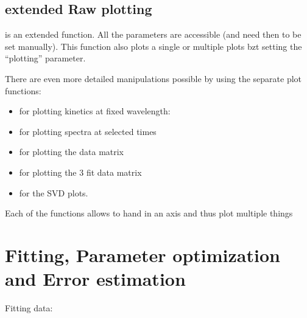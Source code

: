 \documentclass[letterpaper,10pt,english]{sphinxmanual}
\begin{document}
\section{extended Raw plotting}
\label{\detokenize{Plotting:extended-raw-plotting}}
 is an extended function. All the parameters are
accessible (and need then to be set manually). This function also plots a single
or multiple plots bzt setting the “plotting” parameter.

There are even more detailed manipulations possible by using the
separate plot functions:
\begin{itemize}
\item {} 
for plotting kinetics at fixed wavelength: {\hyperref[\detokenize{plot_func:plot_func.plot1d}]{}}

\item {} 
for plotting spectra at selected times {\hyperref[\detokenize{plot_func:plot_func.plot_time}]{}}

\item {} 
for plotting the data matrix {\hyperref[\detokenize{plot_func:plot_func.plot2d}]{}}

\item {} 
for plotting the 3 fit data matrix {\hyperref[\detokenize{plot_func:plot_func.plot2d_fit}]{}}

\item {} 
for the SVD plots. {\hyperref[\detokenize{plot_func:plot_func.SVD}]{}}

\end{itemize}

Each of the functions allows to hand in an axis and thus plot multiple things


\chapter{Fitting, Parameter optimization and Error estimation}
\label{\detokenize{Fitting:fitting-parameter-optimization-and-error-estimation}}\label{\detokenize{Fitting::doc}}
Fitting data:                           {\hyperref[\detokenize{plot_func:plot_func.TA.Fit_Global}]{}}
\end{document}
